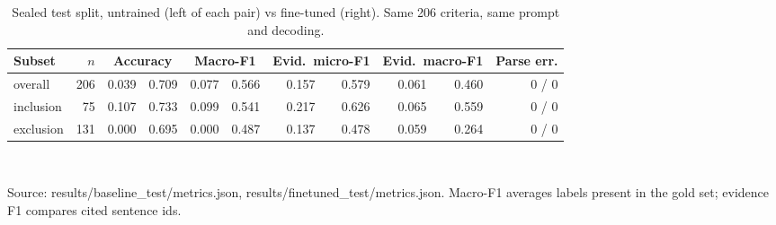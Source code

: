 \begin{table}[t]
\centering
\caption{Sealed test split, untrained (left of each pair) vs fine-tuned (right). Same 206 criteria, same prompt and decoding.}
\label{tab:test}
\footnotesize
\setlength{\tabcolsep}{4pt}
\begin{tabular}{lr|rr|rr|rr|rr|r}
\toprule
Subset & $n$ & \multicolumn{2}{c|}{Accuracy} & \multicolumn{2}{c|}{Macro-F1} & \multicolumn{2}{c|}{Evid.\ micro-F1} & \multicolumn{2}{c|}{Evid.\ macro-F1} & Parse err. \\
\midrule
overall & 206 & 0.039 & 0.709 & 0.077 & 0.566 & 0.157 & 0.579 & 0.061 & 0.460 & 0 / 0 \\
inclusion & 75 & 0.107 & 0.733 & 0.099 & 0.541 & 0.217 & 0.626 & 0.065 & 0.559 & 0 / 0 \\
exclusion & 131 & 0.000 & 0.695 & 0.000 & 0.487 & 0.137 & 0.478 & 0.059 & 0.264 & 0 / 0 \\
\bottomrule
\end{tabular}
\\[2pt]\parbox{0.95\linewidth}{\scriptsize Source: results/baseline\_test/metrics.json, results/finetuned\_test/metrics.json. Macro-F1 averages labels present in the gold set; evidence F1 compares cited sentence ids.}
\end{table}
